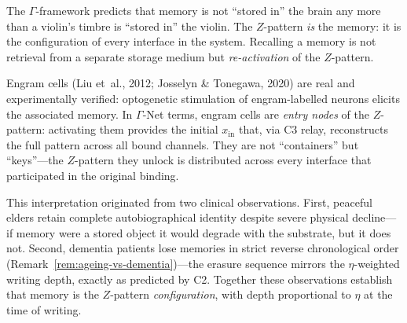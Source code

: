 \documentclass[aps,pre,twocolumn,superscriptaddress,floatfix]{revtex4-2}
\begin{document}
\begin{remark}
\label{rem:memory-is-Z}
The $\Gamma$-framework predicts that memory is not
``stored in'' the brain any more than a violin's
timbre is ``stored in'' the violin.
The $Z$-pattern \emph{is} the memory: it is the
configuration of every interface in the system.
Recalling a memory is not retrieval from a separate
storage medium but \emph{re-activation} of the
$Z$-pattern.

Engram cells (Liu et~al., 2012; Josselyn \& Tonegawa,
2020) are real and experimentally verified: optogenetic
stimulation of engram-labelled neurons elicits the
associated memory.
In $\Gamma$-Net terms, engram cells are
\emph{entry nodes} of the $Z$-pattern: activating them
provides the initial $x_{\text{in}}$ that, via C3
relay, reconstructs the full pattern across all bound
channels.
They are not ``containers'' but ``keys''---the
$Z$-pattern they unlock is distributed across every
interface that participated in the original binding.

This interpretation originated from two clinical
observations.
First, peaceful elders retain complete
autobiographical identity despite severe physical
decline---if memory were a stored object it would
degrade with the substrate, but it does not.
Second, dementia patients lose memories in strict
reverse chronological order
(Remark~\ref{rem:ageing-vs-dementia})---the erasure
sequence mirrors the $\eta$-weighted writing depth,
exactly as predicted by C2.
Together these observations establish that memory is
the $Z$-pattern \emph{configuration}, with depth
proportional to $\eta$ at the time of writing.
\end{remark}
\end{document}
